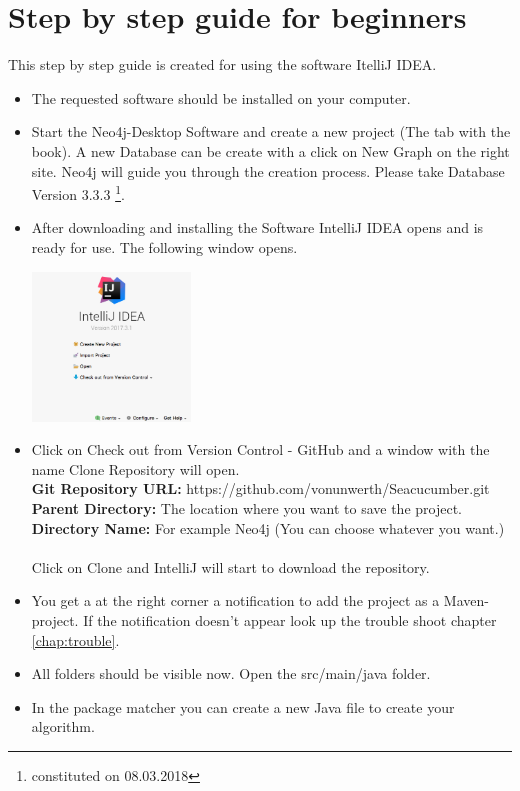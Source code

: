 \section{Step by step guide for beginners}\label{sec:stepByStepManualNew}
This step by step guide is created for using the software \glqq ItelliJ IDEA\grqq{}.
\begin{itemize}
	\item The requested software should be installed on your computer.
	\item Start the Neo4j-Desktop Software and create a new project (The tab with the book). A new Database can be create with a click on New Graph on the right site. Neo4j will guide you through the creation process. Please take Database Version 3.3.3 \footnote{constituted on 08.03.2018}.
	\item After downloading and installing the Software \glqq IntelliJ IDEA\grqq{} opens and is ready for use. The following window opens. \newpage
	\begin{center}
		\includegraphics[width=4.2cm]{common/IntelliJstart.png}\setlength{\unitlength}{1mm}
	\end{center}
	
	\item Click on \glqq Check out from Version Control - GitHub\grqq{} and a window with the name \glqq Clone Repository\grqq{} will open. \\
	\textbf{Git Repository URL:} https://github.com/vonunwerth/Seacucumber.git \\
	\textbf{Parent Directory:} The location where you want to save the project.  \\
	\textbf{Directory Name:} For example Neo4j (You can choose whatever you want.)\\
	\\
	Click on Clone and IntelliJ will start to download the repository.
	
	\item You get a at the right corner a notification to add the project as a Maven-project. If the notification doesn't appear look up the trouble shoot chapter \ref{chap:trouble}.
	
	\item All folders should be visible now. Open the src/main/java folder.
	\item In the \glqq package matcher\grqq{} you can create a new Java file to create your algorithm.
\end{itemize}

